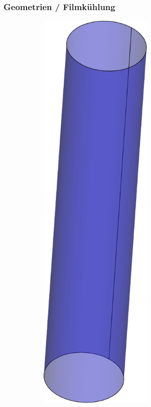 \documentclass[8pt, aspectratio=169]{beamer}
\begin{document}
\begin{frame}
	\frametitle{Geometrien / Filmkühlung}
	\vspace{-1.5cm}
	\centering
	\begin{minipage}[t]{\textwidth}
		\begin{figure}[H]
			\centering
			\begin{subfigure}{.15\textwidth}
				\includegraphics[width=0.6\textwidth]{../../tec/holes/16.png}

\end{subfigure}
\end{figure}
\end{minipage}
\end{frame}
\end{document}
